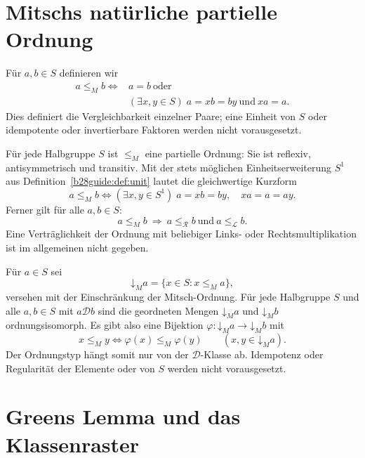 \section{Mitschs natürliche partielle Ordnung}

\begin{definition}
Für $a,b\in S$ definieren wir
\[
\begin{aligned}
 a\leq_M b\iff{}&a=b\ \text{oder}\\
 & (\exists x,y\in S)\;a=xb=by\ \text{und}\ xa=a.
\end{aligned}
\]
Dies definiert die Vergleichbarkeit einzelner Paare; eine Einheit von $S$
oder idempotente oder invertierbare Faktoren werden nicht vorausgesetzt.
\end{definition}

\begin{theorem}
\label{b28guide:thm:mitsch}
Für jede Halbgruppe $S$ ist $\leq_M$ eine partielle Ordnung:
Sie ist reflexiv, antisymmetrisch und transitiv.
Mit der stets möglichen Einheitserweiterung $S^1$ aus
Definition~\ref{b28guide:def:unit} lautet die gleichwertige Kurzform
\[
 a\leq_M b
 \iff
 (\exists x,y\in S^1)\;
 a=xb=by,\quad xa=a=ay.
\]
Ferner gilt für alle $a,b\in S$:
\[
 a\leq_M b
 \ \Longrightarrow\
 a\leq_{\mathcal R}b\ \text{und}\ a\leq_{\mathcal L}b.
\]
Eine Verträglichkeit der Ordnung mit beliebiger Links- oder
Rechtsmultiplikation ist im allgemeinen nicht gegeben.
\cite{mitsch1994}
\end{theorem}

\begin{theorem}
\label{b28guide:thm:jones-order}
Für $a\in S$ sei
\[
 \mathord{\downarrow}_M a=\{x\in S:x\leq_M a\},
\]
versehen mit der Einschränkung der Mitsch-Ordnung.
Für jede Halbgruppe $S$ und alle $a,b\in S$ mit
$a\mathrel{\mathcal D}b$ sind die geordneten Mengen
$\mathord{\downarrow}_M a$ und $\mathord{\downarrow}_M b$
ordnungsisomorph. Es gibt also eine Bijektion
$\varphi:\mathord{\downarrow}_M a\to\mathord{\downarrow}_M b$ mit
\[
 x\leq_M y\iff\varphi(x)\leq_M\varphi(y)
 \qquad(x,y\in\mathord{\downarrow}_M a).
\]
Der Ordnungstyp hängt somit nur von der $\mathcal D$-Klasse ab.
Idempotenz oder Regularität der Elemente oder von $S$ werden
nicht vorausgesetzt. \cite{mitsch1994}
\end{theorem}

\section{Greens Lemma und das Klassenraster}

